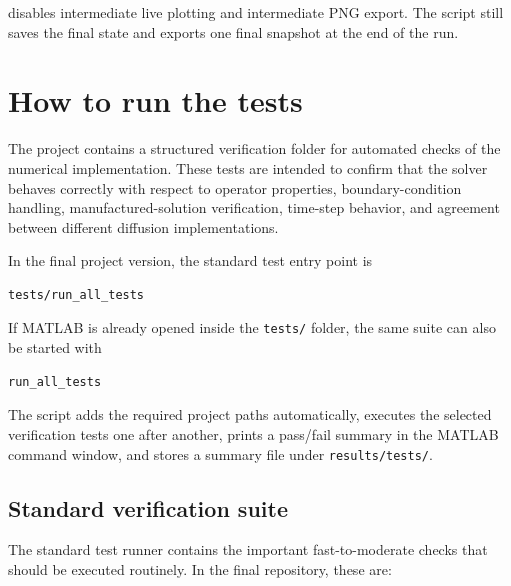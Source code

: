 disables intermediate live plotting and intermediate PNG export. The script still saves the final state and exports one final snapshot at the end of the run.

\section{How to run the tests}
\label{sec:manual_tests}

The project contains a structured verification folder for automated checks of the numerical implementation. These tests are intended to confirm that the solver behaves correctly with respect to operator properties, boundary-condition handling, manufactured-solution verification, time-step behavior, and agreement between different diffusion implementations.

In the final project version, the standard test entry point is

\begin{verbatim}
tests/run_all_tests
\end{verbatim}

If MATLAB is already opened inside the \texttt{tests/} folder, the same suite can also be started with

\begin{verbatim}
run_all_tests
\end{verbatim}

The script adds the required project paths automatically, executes the selected verification tests one after another, prints a pass/fail summary in the MATLAB command window, and stores a summary file under \texttt{results/tests/}.

\subsection*{Standard verification suite}

The standard test runner contains the important fast-to-moderate checks that should be executed routinely. In the final repository, these are:

